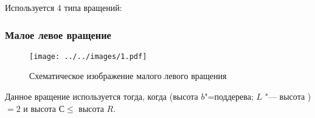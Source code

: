 \begin{frame}
    Используется 4 типа вращений:

    \frametitle{Малое левое вращение}

    \begin{figure}[ht]
        \texttt{[image: ../../images/1.pdf]}
        
        \caption{Схематическое изображение малого левого вращения}    
    \end{figure}

    Данное вращение используется тогда,
    когда (высота $b$"=поддерева; $L$ "--- высота )
    $= 2$ и высота $С \leqslant$ высота $R$.

\end{frame}